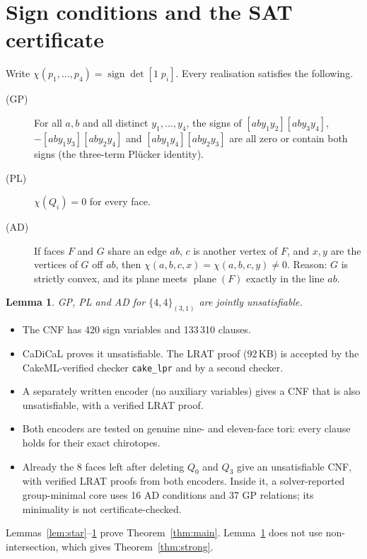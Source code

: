 \documentclass[11pt]{article}
\newtheorem{lemma}[theorem]{Lemma}
\begin{document}
\section{Sign conditions and the SAT certificate}
Write $\chi(p_1,\dots,p_4)=\operatorname{sign}\det[1\;p_i]$. Every realisation satisfies the following.
\begin{description}
\item[(GP)] For all $a,b$ and all distinct $y_1,\dots,y_4$, the signs of
  $[aby_1y_2][aby_3y_4]$, $-[aby_1y_3][aby_2y_4]$ and $[aby_1y_4][aby_2y_3]$ are all zero or contain both signs
  (the three-term Pl\"ucker identity).
\item[(PL)] $\chi(Q_i)=0$ for every face.
\item[(AD)] If faces $F$ and $G$ share an edge $ab$, $c$ is another vertex of $F$, and $x,y$ are the vertices of
  $G$ off $ab$, then $\chi(a,b,c,x)=\chi(a,b,c,y)\neq 0$. Reason: $G$ is strictly convex, and its plane meets
  $\operatorname{plane}(F)$ exactly in the line $ab$.
\end{description}

\begin{lemma}\label{lem:sat}
GP, PL and AD for $\{4,4\}_{(3,1)}$ are jointly unsatisfiable.
\end{lemma}
\begin{itemize}
\item The CNF has 420 sign variables and 133\,310 clauses.
\item CaDiCaL proves it unsatisfiable. The LRAT proof (92\,KB) is accepted by the CakeML-verified checker
  \texttt{cake\_lpr} and by a second checker.
\item A separately written encoder (no auxiliary variables) gives a CNF that is also unsatisfiable, with a
  verified LRAT proof.
\item Both encoders are tested on genuine nine- and eleven-face tori: every clause holds for their exact
  chirotopes.
\item Already the 8 faces left after deleting $Q_0$ and $Q_3$ give an unsatisfiable CNF, with verified
  LRAT proofs from both encoders. Inside it, a solver-reported group-minimal core uses 16 AD conditions
  and 37 GP relations; its minimality is not certificate-checked.
\end{itemize}
Lemmas~\ref{lem:star}--\ref{lem:sat} prove Theorem~\ref{thm:main}. Lemma~\ref{lem:sat} does not use
non-intersection, which gives Theorem~\ref{thm:strong}.
\end{document}
